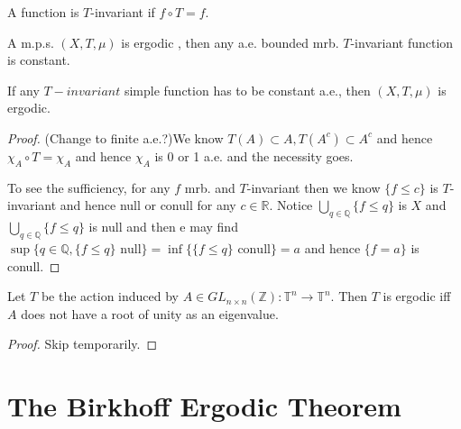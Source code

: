 \documentclass[lang=en, color=blue, ]{elegantbook}
\newcommand{\R}{\mathbb{R}}
\newcommand{\Z}{\mathbb{Z}}
\newcommand{\Q}{\mathbb{Q}}
\newcommand{\T}{\mathbb{T}}
\begin{document}
\begin{definition}
    A function is $T$-invariant if $f\circ T = f$.
\end{definition}
\begin{lemma}
    A m.p.s. $(X,T,\mu)$ is ergodic , then any a.e. bounded mrb. $T$-invariant function is constant. \par
    If any $T-invariant$ simple function has to be constant a.e., then $(X,T,\mu)$ is ergodic.\par 
\end{lemma}
\begin{proof}\par
    (Change to finite a.e.?)We know $T(A) \subset A, T(A^c)\subset A^c$ and hence $\chi_A \circ T= \chi_A$ and hence $\chi_A$ is 0 or 1 a.e. and the necessity goes.\par
    To see the sufficiency, for any $f$ mrb. and $T$-invariant then we know $\{f\leq c\}$ is $T$-invariant and hence null or conull for any $c\in\R$. Notice $\bigcup_{q\in\Q} \{f\leq q\}$ is $X$ and $\bigcup_{q\in\Q}\{f\leq q\}$ is null and then e may find $\sup\{q\in\Q,\{f\leq q\}\text{ null}\} = \inf\{\{f\leq q\}\text{ conull}\}= a$ and hence $\{f=a\}$ is conull. 
\end{proof}
\begin{lemma}
Let $T$ be the action induced by $A\in GL_{n\times n}(\Z):\T^n\to \T^n$. Then $T$ is ergodic iff $A$ does not have a root of unity as an eigenvalue.
\end{lemma}
\begin{proof}\par
    Skip temporarily.
\end{proof}

\section*{The Birkhoff Ergodic Theorem}
\end{document}
